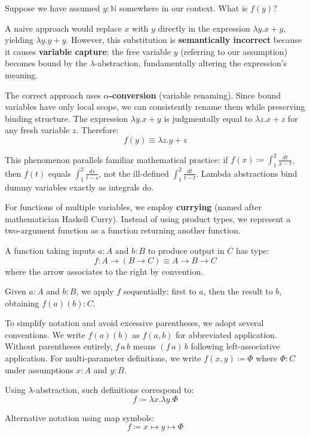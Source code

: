 Suppose we have assumed $y : \mathbb{N}$ somewhere in our context. What is $f(y)$? 

A naive approach would replace $x$ with $y$ directly in the expression $\lambda y. x + y$, yielding $\lambda y. y + y$. However, this substitution is \textbf{semantically incorrect} because it causes \textbf{variable capture}: the free variable $y$ (referring to our assumption) becomes bound by the $\lambda$-abstraction, fundamentally altering the expression's meaning.

The correct approach uses \textbf{$\alpha$-conversion} (variable renaming). 
Since bound variables have only local scope, we can consistently rename them while preserving binding structure. 
The expression $\lambda y. x + y$ is judgmentally equal to $\lambda z. x + z$ for any fresh variable $z$. Therefore:
$$ f(y) \equiv \lambda z. y + z $$

This phenomenon parallels familiar mathematical practice: if $f(x) \coloneqq \int_1^2 \frac{dt}{x-t}$, 
then $f(t)$ equals $\int_1^2 \frac{ds}{t-s}$, not the ill-defined $\int_1^2 \frac{dt}{t-t}$. 
Lambda abstractions bind dummy variables exactly as integrals do.

For functions of multiple variables, we employ \textbf{currying} (named after mathematician Haskell Curry). Instead of using product types, we represent a two-argument function as a function returning another function.

A function taking inputs $a : A$ and $b : B$ to produce output in $C$ has type:
$$ f : A \to (B \to C) \equiv A \to B \to C $$
where the arrow associates to the right by convention.

Given $a : A$ and $b : B$, we apply $f$ sequentially: first to $a$, then the result to $b$, obtaining $f(a)(b) : C$.

To simplify notation and avoid excessive parentheses, we adopt several conventions. We write $f(a)(b)$ as $f(a, b)$ for abbreviated application. Without parentheses entirely, $f \, a \, b$ means $(f \, a) \, b$ following left-associative application. For multi-parameter definitions, we write $f(x, y) \coloneqq \Phi$ where $\Phi : C$ under assumptions $x : A$ and $y : B$.

Using $\lambda$-abstraction, such definitions correspond to:
$$ f \coloneqq \lambda x. \lambda y. \Phi $$ 

Alternative notation using map symbols:
$$ f \coloneqq x \mapsto y \mapsto \Phi $$

